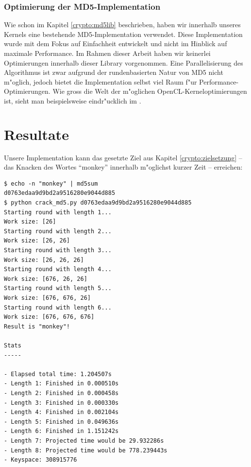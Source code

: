 \begin{refsection}
\subsubsection{Optimierung der MD5-Implementation}

Wie schon im Kapitel \ref{crypto:md5lib} beschrieben, haben wir innerhalb
unseres Kernels eine bestehende MD5-Implementation verwendet. Diese
Implementation wurde mit dem Fokus auf Einfachheit entwickelt und nicht im
Hinblick auf maximale Performance. Im Rahmen dieser Arbeit haben wir keinerlei
Optimierungen innerhalb dieser Library vorgenommen. Eine Parallelisierung des
Algorithmus ist zwar aufgrund der rundenbasierten Natur von MD5 nicht m"oglich,
jedoch bietet die Implementation selbst viel Raum f"ur
Performance-Optimierungen. Wie gross die Welt der m"oglichen
OpenCL-Kerneloptimierungen ist, sieht man beispielsweise eindr"ucklich im
 \cite{crypto:nvidia_bestpractices}.


\section{Resultate}

Unsere Implementation kann das gesetzte Ziel aus Kapitel
\ref{crypto:zielsetzung} -- das Knacken des Wortes ``monkey'' innerhalb
m"oglichst kurzer Zeit -- erreichen:

\begin{small}
\begin{verbatim}
$ echo -n "monkey" | md5sum
d0763edaa9d9bd2a9516280e9044d885
$ python crack_md5.py d0763edaa9d9bd2a9516280e9044d885
Starting round with length 1...
Work size: [26]
Starting round with length 2...
Work size: [26, 26]
Starting round with length 3...
Work size: [26, 26, 26]
Starting round with length 4...
Work size: [676, 26, 26]
Starting round with length 5...
Work size: [676, 676, 26]
Starting round with length 6...
Work size: [676, 676, 676]
Result is "monkey"!

Stats
-----

- Elapsed total time: 1.204507s
- Length 1: Finished in 0.000510s
- Length 2: Finished in 0.000458s
- Length 3: Finished in 0.000330s
- Length 4: Finished in 0.002104s
- Length 5: Finished in 0.049636s
- Length 6: Finished in 1.151242s
- Length 7: Projected time would be 29.932286s
- Length 8: Projected time would be 778.239443s
- Keyspace: 308915776
\end{verbatim}
\end{small}


\end{refsection}
